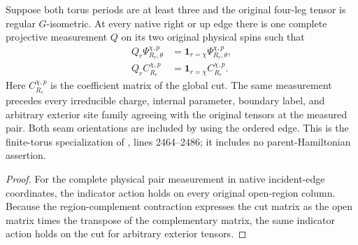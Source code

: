 \begin{lemma}
    \label{thm:peps_torus_edge_physical_charge_measurement}
    \leanok
    Suppose both torus periods are at least three and the original four-leg tensor
    is regular $G$-isometric. At every native right or up edge there is one complete
    projective measurement $Q$ on its two original physical spins such that
    \begin{align}
        Q_r\Psi^{\chi,p}_{R_e,\theta}
         & =\mathbf1_{r=\chi}\Psi^{\chi,p}_{R_e,\theta}, \\
        Q_r C^{\chi,p}_{R_e}
         & =\mathbf1_{r=\chi}C^{\chi,p}_{R_e}.
    \end{align}
    Here $C^{\chi,p}_{R_e}$ is the coefficient matrix of the global cut.
    The same measurement precedes every irreducible charge, internal parameter,
    boundary label, and arbitrary exterior site family agreeing with the original
    tensors at the measured pair. Both seam orientations are included by using
    the ordered edge. This is the finite-torus specialization of
    \cite[Detection of chargeons]{Schuch2010PEPS}, lines 2464--2486; it includes
    no parent-Hamiltonian assertion.
\end{lemma}
\begin{proof}\leanok
    For the complete physical pair measurement in native incident-edge
    coordinates, the indicator action holds on every original open-region
    column. Because the region-complement contraction expresses the cut matrix
    as the open matrix times the transpose of the complementary matrix, the
    same indicator action holds on the cut for arbitrary exterior tensors.
\end{proof}
